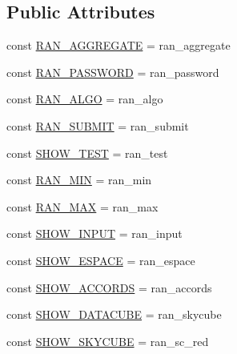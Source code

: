 \subsection*{Public Attributes}
\begin{DoxyCompactItemize}
\item 
const \hyperlink{class_page_run_analysis_a6e8e6a9e1687ed71f04ac0aa4f0e54a9}{R\+A\+N\+\_\+\+A\+G\+G\+R\+E\+G\+A\+TE} = \textquotesingle{}ran\+\_\+aggregate\textquotesingle{}
\item 
const \hyperlink{class_page_run_analysis_a638dbc1933e2b8810f6fc3521a508e9a}{R\+A\+N\+\_\+\+P\+A\+S\+S\+W\+O\+RD} = \textquotesingle{}ran\+\_\+password\textquotesingle{}
\item 
const \hyperlink{class_page_run_analysis_a9a7155dac8bd013fca991eb85df7e57d}{R\+A\+N\+\_\+\+A\+L\+GO} = \textquotesingle{}ran\+\_\+algo\textquotesingle{}
\item 
const \hyperlink{class_page_run_analysis_ad155289f2495868e1d64c6d0ed482330}{R\+A\+N\+\_\+\+S\+U\+B\+M\+IT} = \textquotesingle{}ran\+\_\+submit\textquotesingle{}
\item 
const \hyperlink{class_page_run_analysis_aa43b0679cdc7adf3b772971ff679a304}{S\+H\+O\+W\+\_\+\+T\+E\+ST} = \textquotesingle{}ran\+\_\+test\textquotesingle{}
\item 
const \hyperlink{class_page_run_analysis_ad98dd9f75da640403bb0261d3d753777}{R\+A\+N\+\_\+\+M\+IN} = \textquotesingle{}ran\+\_\+min\textquotesingle{}
\item 
const \hyperlink{class_page_run_analysis_a7a868ee3f227a6261a154582260328c0}{R\+A\+N\+\_\+\+M\+AX} = \textquotesingle{}ran\+\_\+max\textquotesingle{}
\item 
const \hyperlink{class_page_run_analysis_a36e8dd0a333ee9918affa8862be5ed4c}{S\+H\+O\+W\+\_\+\+I\+N\+P\+UT} = \textquotesingle{}ran\+\_\+input\textquotesingle{}
\item 
const \hyperlink{class_page_run_analysis_a4067e713b705da8814b47f0a793265e3}{S\+H\+O\+W\+\_\+\+E\+S\+P\+A\+CE} = \textquotesingle{}ran\+\_\+espace\textquotesingle{}
\item 
const \hyperlink{class_page_run_analysis_adcedaec3fbda6236f0ea4246dde4aa71}{S\+H\+O\+W\+\_\+\+A\+C\+C\+O\+R\+DS} = \textquotesingle{}ran\+\_\+accords\textquotesingle{}
\item 
const \hyperlink{class_page_run_analysis_af304c059504d1ccb4b9796e320a382ba}{S\+H\+O\+W\+\_\+\+D\+A\+T\+A\+C\+U\+BE} = \textquotesingle{}ran\+\_\+skycube\textquotesingle{}
\item 
const \hyperlink{class_page_run_analysis_a8238efaf7dc8a70050fbae99c729756b}{S\+H\+O\+W\+\_\+\+S\+K\+Y\+C\+U\+BE} = \textquotesingle{}ran\+\_\+sc\+\_\+red\textquotesingle{}

\end{DoxyCompactItemize}
